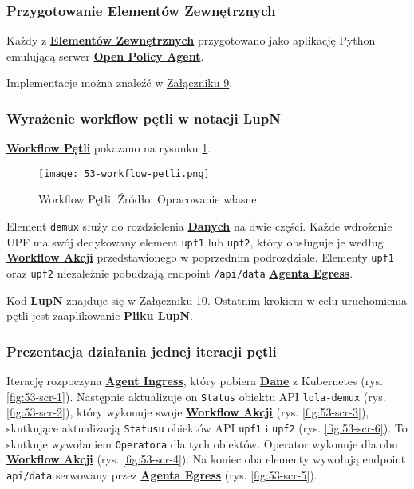 \subsubsection{Przygotowanie Elementów Zewnętrznych}

Każdy z \hyperlink{def:element-zewnetrzny}{\textbf{Elementów Zewnętrznych}} przygotowano jako aplikację Python emulującą serwer \hyperlink{def:opa}{\textbf{Open Policy Agent}}.

Implementacje można znaleźć w \hyperlink{appendix:9}{Załączniku 9}.

\subsubsection{Wyrażenie workflow pętli w notacji LupN}

\hyperlink{def:workflow-petli}{\textbf{Workflow Pętli}} pokazano na rysunku \ref{fig:53-workflow-petli}.

\begin{figure}[!h]
    \centering \texttt{[image: 53-workflow-petli.png]}
    \caption{Workflow Pętli. Źródło: Opracowanie własne.}\label{fig:53-workflow-petli}
\end{figure}

Element \texttt{demux} służy do rozdzielenia \hyperlink{def:dane}{\textbf{Danych}} na dwie części. Każde wdrożenie UPF ma swój dedykowany element \texttt{upf1} lub \texttt{upf2}, który obsługuje je według \hyperlink{def:workflow-petli}{\textbf{Workflow Akcji}} przedstawionego w poprzednim podrozdziale. Elementy \texttt{upf1} oraz \texttt{upf2} niezależnie pobudzają endpoint \texttt{/api/data} \hyperlink{def:agent-egress}{\textbf{Agenta Egress}}.

Kod \hyperlink{def:lupn}{\textbf{LupN}} znajduje się w \hyperlink{appendix:10}{Załączniku 10}. Ostatnim krokiem w celu uruchomienia pętli jest zaaplikowanie \hyperlink{def:plik-lupn}{\textbf{Pliku LupN}}.

\subsubsection{Prezentacja działania jednej iteracji pętli}

Iterację rozpoczyna \hyperlink{def:agent-ingress}{\textbf{Agent Ingress}}, który pobiera \hyperlink{def:dane}{\textbf{Dane}} z Kubernetes (rys. \ref{fig:53-scr-1}). Następnie aktualizuje on \texttt{Status} obiektu API \texttt{lola-demux} (rys. \ref{fig:53-scr-2}), który wykonuje swoje \hyperlink{def:workflow-petli}{\textbf{Workflow Akcji}} (rys. \ref{fig:53-scr-3}), skutkujące aktualizacją \texttt{Statusu} obiektów API \texttt{upf1} i \texttt{upf2} (rys. \ref{fig:53-scr-6}). To skutkuje wywołaniem \texttt{Operatora} dla tych obiektów. Operator wykonuje dla obu \hyperlink{def:workflow-petli}{\textbf{Workflow Akcji}} (rys. \ref{fig:53-scr-4}). Na koniec oba elementy wywołują endpoint \texttt{api/data} serwowany przez \hyperlink{def:agent-egress}{\textbf{Agenta Egress}} (rys. \ref{fig:53-scr-5}).


